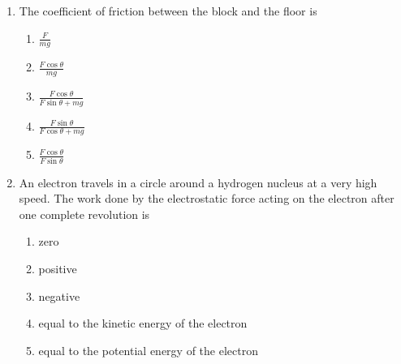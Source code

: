 \documentclass{../../oss-apphys}
\begin{document}
\begin{multicols}{2}
\begin{enumerate}[resume,leftmargin=18pt]
  \item The coefficient of friction between the block and the floor is
    \begin{enumerate}[noitemsep,topsep=0pt,leftmargin=18pt,label=(\Alph*)]
    \item $\displaystyle\frac{F}{mg}$
    \item $\displaystyle\frac{F\cos\theta}{mg}$
    \item $\displaystyle\frac{F\cos\theta}{F\sin\theta+mg}$
    \item $\displaystyle\frac{F\sin\theta}{F\cos\theta+mg}$
    \item $\displaystyle\frac{F\cos\theta}{F\sin\theta}$
    \end{enumerate}

  \item An electron travels in a circle around a hydrogen nucleus at a very high
    speed. The work done by the electrostatic force acting on the electron
    after one complete revolution is
    \begin{enumerate}[noitemsep,topsep=0pt,leftmargin=18pt,label=(\Alph*)]
    \item zero
    \item positive
    \item negative
    \item equal to the kinetic energy of the electron
    \item equal to the potential energy of the electron
    \end{enumerate}
    
  \end{enumerate}
\end{multicols}
\end{document}
